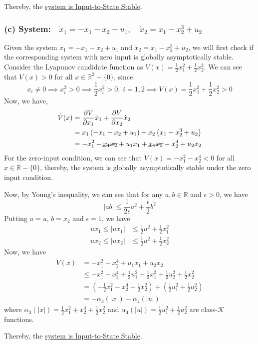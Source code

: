 Thereby, the \underline{system is Input-to-State Stable}.

\subsubsection*{(c) System:\( \quad \dot{x}_{1}=-x_{1}-x_{2}+u_{1}, \quad \dot{x}_{2}=x_{1}-x_{2}^{3}+u_{2} \)}

Given the system \( \dot{x}_{1}=-x_{1}-x_{2}+u_{1} \) and \( \dot{x}_{2}=x_{1}-x_{2}^{3}+u_{2} \), we will first check if the corresponding system with zero input is globally asymptotically stable.
Consider the Lyapunov candidate function as \( V(x)=\frac{1}{2} x_{1}^{2}+\frac{1}{2} x_{2}^{2} \).
We can see that \( V(x) > 0 \) for all \( x \in \mathbb{R}^2 - \{ 0 \} \), since
\begin{equation*}
    x_i \neq 0
    \implies
    x_i^2 > 0
    \implies
    \frac{1}{2} x_i^2 > 0,
    \;
    i = 1, 2
    \implies
    V(x)
    =
    \frac{1}{2} x_1^2 + \frac{1}{2} x_2^2
    > 0
\end{equation*}
Now, we have,
\begin{align*}
    \dot{V}(x)
     & =
    \frac{\partial V}{\partial x_1} \dot{x}_1 + \frac{\partial V}{\partial x_2} \dot{x}_2
    \\
     & =
    x_1 \left( -x_1 - x_2 + u_1 \right) + x_2 \left( x_1 - x_2^3 + u_2 \right)
    \\
     & =
    -x_1^2 - \cancel{x_1 x_2} + u_1 x_1 + \cancel{x_1 x_2} - x_2^4 + u_2 x_2
\end{align*}
For the zero-input condition, we can see that \( \dot{V}(x) = -x_1^2 - x_2^4 < 0 \) for all \( x \in \mathbb{R} - \{ 0 \} \), thereby, the system is globally asymptotically stable under the zero input condition.

Now, by Young's inequality, we can see that for any \( a, b \in \mathbb{R} \) and \( \epsilon > 0 \), we have
\begin{equation*}
    \left| a b \right|
    \leq
    \frac{1}{2 \epsilon} a^2 + \frac{\epsilon}{2} b^2
\end{equation*}
Putting \( a = u \), \( b = x_2 \) and \( \epsilon = 1 \), we have
\begin{align*}
    u x_1 \leq \left| u x_1 \right|
     & \leq
    \frac{1}{2} u^2 + \frac{1}{2} x_1^2
    \\
    u x_2 \leq \left| u x_2 \right|
     & \leq
    \frac{1}{2} u^2 + \frac{1}{2} x_2^2
\end{align*}
Now, we have
\begin{align*}
    \dot{V}(x)
     & =
    -x_1^2 - x_2^4 + u_1 x_1 + u_2 x_2
    \\ & \leq
    -x_1^2 - x_2^4 + \frac{1}{2} u_1^2 + \frac{1}{2} x_1^2 + \frac{1}{2} u_2^2 + \frac{1}{2} x_2^2
    \\ & =
    \left( - \frac{1}{2} x_1^2 -x_2^4 - \frac{1}{2} x_2^2 \right) + \left( \frac{1}{2} u_1^2 + \frac{1}{2} u_2^2 \right)
    \\ & =
    - \alpha_3(|x|) - \alpha_4(|u|)
\end{align*}
where \( \alpha_3(|x|) = \frac{1}{2} x_1^2 + x_2^4 + \frac{1}{2} x_2^2 \) and \( \alpha_4(|u|) = \frac{1}{2} u_1^2 + \frac{1}{2} u_2^2 \) are class-\( \mathcal{K} \) functions.

Thereby, the \underline{system is Input-to-State Stable}.
